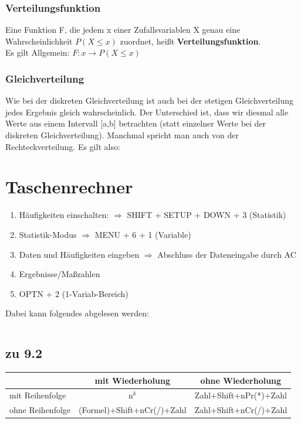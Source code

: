 \documentclass[a4paper,10pt]{scrartcl}
\begin{document}
\subsubsection{Verteilungsfunktion}
Eine Funktion F, die jedem x einer Zufallsvariablen X genau eine Wahrscheinlichkeit $P(X \le x)$ zuordnet, heißt \textbf{Verteilungsfunktion}.\\
Es gilt Allgemein: $F: x \rightarrow P(X \le x)$

\subsubsection{Gleichverteilung}
Wie bei der diskreten Gleichverteilung ist auch bei der stetigen Gleichverteilung jedes Ergebnis gleich wahrscheinlich. Der Unterschied ist, dass wir diesmal alle Werte aus einem Intervall [a,b] betrachten (statt einzelner Werte bei der diskreten Gleichverteilung). Manchmal spricht man auch von der Rechteckverteilung. Es gilt also:





\newpage
\section{Taschenrechner}
\begin{enumerate}
    \item Häufigkeiten einschalten:
    $\Rightarrow$ SHIFT + SETUP + DOWN + 3 (Statistik)
    \item Statistik-Modus
    $\Rightarrow$ MENU + 6 + 1 (Variable)
    \item Daten und Häufigkeiten eingeben
    $\Rightarrow$ Abschluss der Dateneingabe durch AC
    \item Ergebnisse/Maßzahlen
    \item OPTN + 2 (1-Variab-Bereich)
\end{enumerate}
Dabei kann folgendes abgelesen werden:
\begin{table}[]
    \begin{tabular}{|r|l|}\hline
    \end{tabular}
\end{table}
\subsection{zu 9.2}
\begin{tabular}{|l|c|c|} \hline
 & mit Wiederholung & ohne Wiederholung \\\hline
mit Reihenfolge & n$^{k}$ & Zahl+Shift+nPr(*)+Zahl \\\hline
ohne Reihenfolge & (Formel)+Shift+nCr(/)+Zahl &  Zahl+Shift+nCr(/)+Zahl \\\hline
\end{tabular}
\end{document}
